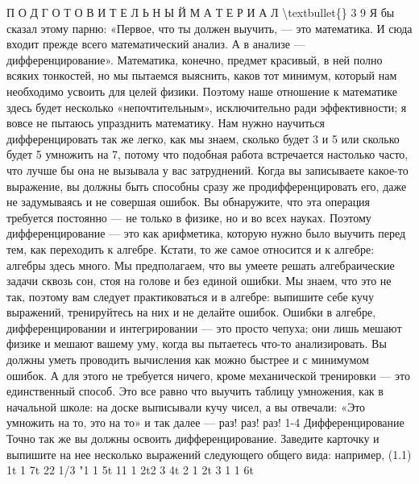 \documentclass[10pt,oneside]{article}
\begin{document}
П О Д Г О Т О В И Т Е Л Ь Н Ы Й  М А Т Е Р И А Л \textbackslash{}textbullet\{\} 3 9 Я бы сказал этому парню: «Первое, что ты должен выучить, --- это математика. И сюда входит прежде всего математический анализ. А в анализе --- дифференцирование». Математика, конечно, предмет красивый, в ней полно всяких тонкостей, но мы пытаемся выяснить, каков тот минимум, который нам необходимо усвоить для целей физики. Поэтому наше отношение к математике здесь будет несколько «непочтительным», исключительно ради эффективности; я вовсе не пытаюсь упразднить математику. Нам нужно научиться дифференцировать так же легко, как мы знаем, сколько будет 3 и 5 или сколько будет 5 умножить на 7, потому что подобная работа встречается настолько часто, что лучше бы она не вызывала у вас затруднений. Когда вы записываете какое-то выражение, вы должны быть способны сразу же продифференцировать его, даже не задумываясь и не совершая ошибок. Вы обнаружите, что эта операция требуется постоянно --- не только в физике, но и во всех науках. Поэтому дифференцирование --- это как арифметика, которую нужно было выучить перед тем, как переходить к алгебре. Кстати, то же самое относится и к алгебре: алгебры здесь много. Мы предполагаем, что вы умеете решать алгебраические задачи сквозь сон, стоя на голове и без единой ошибки. Мы знаем, что это не так, поэтому вам следует практиковаться и в алгебре: выпишите себе кучу выражений, тренируйтесь на них и не делайте ошибок. Ошибки в алгебре, дифференцировании и интегрировании --- это просто чепуха; они лишь мешают физике и мешают вашему уму, когда вы пытаетесь что-то анализировать. Вы должны уметь проводить вычисления как можно быстрее и с минимумом ошибок. А для этого не требуется ничего, кроме механической тренировки --- это единственный способ. Это все равно что выучить таблицу умножения, как в начальной школе: на доске выписывали кучу чисел, а вы отвечали: «Это умножить на то, это на то» и так далее --- раз! раз! раз! 1-4 Дифференцирование Точно так же вы должны освоить дифференцирование. Заведите карточку и выпишите на нее несколько выражений следующего общего вида: например, (1.1) 1t 1 7t 22 1/3 "1 1 5t 11 1 2t2 3 4t 2 1 2t 3 1 1 6t\par
\end{document}
